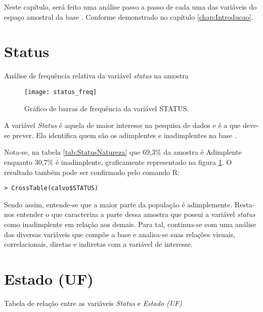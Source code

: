 \label{chap:Variables}Neste capítulo, será feito uma análise passo a passo de cada uma das
variáveis do espaço amostral da base \nomeDaBase{}. Conforme demonstrado
no capítulo \ref{chap:Introducao}.


\section{Status}

\begin{table}[h]
\centering

\caption{\label{tab:StatusEstado}Análise de frequência relativa da variável \emph{status} na amostra}
\end{table}

\begin{figure}
\begin{centering}
\texttt{[image: status\_freq]}
\par\end{centering}

\caption{\label{fig:FreqStatus}Gráfico de barras de frequência da variável
STATUS.}
\end{figure}
A variável \emph{Status }é aquela de maior interesse na pesquisa de
dados e é a que deve-se prever. Ela identifica quem são os adimplentes
e inadimplentes na base \nomeDaBase{}.

Nota-se, na tabela \ref{tab:StatusNatureza} que 69,3\% da amostra
é Adimplente enquanto 30,7\% é inadimplente, graficamente representado
na figura \ref{fig:FreqStatus}. O resultado também pode ser confirmado
pelo comando R:

\begin{verbatim}
> CrossTable(calvo$STATUS)
\end{verbatim}

Sendo assim, entende-se que a maior parte da população é adimplemente. Resta-nos entender o que caracteriza
a parte dessa amostra que possui a variável \emph{status} como inadimplente em relação aos demais. Para tal, continua-se
com uma análise das diversas variáveis que compõe a base e analisa-se suas relações visuais, correlacionais, diretas e indiretas
com a variável de interesse.

\clearpage

\section{Estado (UF)}

\begin{table}[h]
\centering

\caption{\label{tab:StatusEstado}Tabela de relação entre as variáveis \emph{Status} e \emph{Estado (UF)}}
\end{table}

